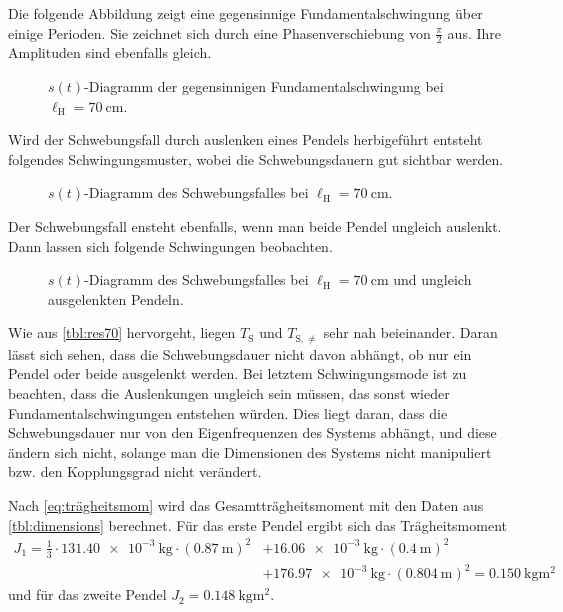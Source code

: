 \documentclass[
12pt,
a4paper,
bibliography=totocnumbered, %
BCOR=1cm, %
oneside, %
]{scrartcl}
\newcommand{\lh}{\ell_{\mathrm{H}}}
\begin{document}
Die folgende Abbildung zeigt eine gegensinnige Fundamentalschwingung über einige Perioden. Sie zeichnet sich durch eine Phasenverschiebung von \(\frac{\pi}{2}\) aus. Ihre Amplituden sind ebenfalls gleich.
\begin{figure}[H]
	\caption{\(s(t)\)-Diagramm der gegensinnigen Fundamentalschwingung bei \(\lh = \qty{70}{\centi\meter}\).}
	\label{fig:geg70}
\end{figure}

Wird der Schwebungsfall durch auslenken eines Pendels herbigeführt entsteht folgendes Schwingungsmuster, wobei die Schwebungsdauern gut sichtbar werden.
\begin{figure}[H]
	\caption{\(s(t)\)-Diagramm des Schwebungsfalles bei \(\lh = \qty{70}{\centi\meter}\).}
	\label{fig:schweb}
\end{figure}

Der Schwebungsfall ensteht ebenfalls, wenn man beide Pendel ungleich auslenkt. Dann lassen sich folgende Schwingungen beobachten.
\begin{figure}[H]
	\caption{\(s(t)\)-Diagramm des Schwebungsfalles bei \(\lh = \qty{70}{\centi\meter}\) und ungleich ausgelenkten Pendeln.}
	\label{fig:ungl70}
\end{figure}

Wie aus \autoref{tbl:res70} hervorgeht, liegen \(T_{\text{S}}\) und \(T_{\text{S},≠}\) sehr nah beieinander. Daran lässt sich sehen, dass die Schwebungsdauer nicht davon abhängt, ob nur ein Pendel oder beide ausgelenkt werden. Bei letztem Schwingungsmode ist zu beachten, dass die Auslenkungen ungleich sein müssen, das sonst wieder Fundamentalschwingungen entstehen würden. Dies liegt daran, dass die Schwebungsdauer nur von den Eigenfrequenzen des Systems abhängt, und diese ändern sich nicht, solange man die Dimensionen des Systems nicht manipuliert bzw. den Kopplungsgrad nicht verändert.

%
%
%

Nach \autoref{eq:trägheitsmom} wird das Gesamtträgheitsmoment mit den Daten aus \autoref{tbl:dimensions} berechnet. Für das erste Pendel ergibt sich das Trägheitsmoment
\begin{equation*}
	\begin{split}
		J_1 = \frac{1}{3} \cdot \qty{131,40e-3}{\kilogram} \cdot (\qty{0,87}{\meter})^2 &+ \qty{16,06e-3}{\kilogram} \cdot (\qty{0,4}{\meter})^2
		\\&+ \qty{176,97e-3}{\kilogram} \cdot (\qty{0,804}{\meter})^2 = \qty{0,150}{\kilogram\meter\squared}
	\end{split}
\end{equation*}
und für das zweite Pendel \(J_2 = \qty{0,148}{\kilogram\meter\squared}\).
\end{document}
